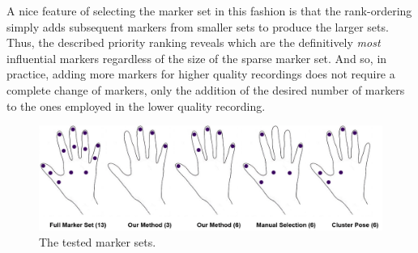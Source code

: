 A nice feature of selecting the marker set in this fashion is that the rank-ordering simply adds subsequent markers from smaller sets to produce the larger sets. Thus, the described priority ranking reveals which are the definitively \emph{most} influential markers regardless of the
size of the sparse marker set. And so, in practice, adding more markers for higher quality recordings does not require a complete change of markers, only the addition of the desired number of markers to the ones employed in the lower quality recording.


\begin{figure}[ht]
  \centering
  \includegraphics[trim = 0mm 0mm 0mm 0mm,
width=\textwidth]{images/marker_sets.jpg} %
  \caption{The tested marker sets.}
  \label{fig:marker_sets}
\end{figure}




